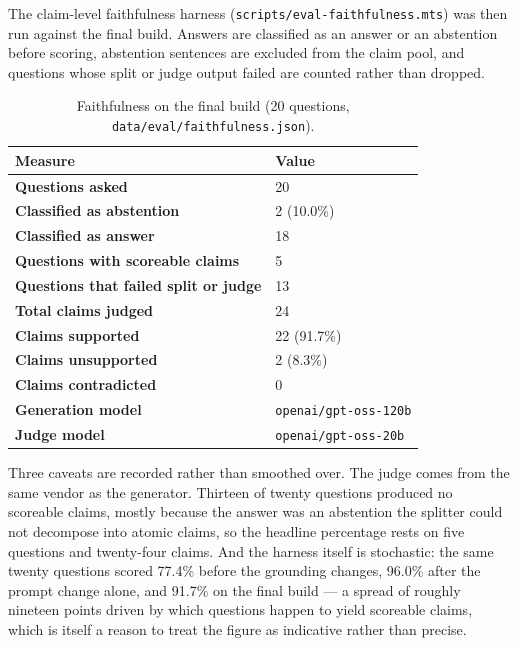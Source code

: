 \documentclass[12pt]{article}
\begin{document}
The claim-level faithfulness harness (\texttt{scripts/eval-faithfulness.mts}) was then run against the final build. Answers are classified as an answer or an abstention before scoring, abstention sentences are excluded from the claim pool, and questions whose split or judge output failed are counted rather than dropped.

\begin{table}[!htbp]
\centering
\caption{Faithfulness on the final build (20 questions, \texttt{data/eval/faithfulness.json}).}
\label{tab:faith}
\begin{tabularx}{0.92\textwidth}{>{\bfseries}p{}X}
\toprule
Measure & Value \\
\midrule
Questions asked & 20 \\
Classified as abstention & 2 (10.0\%) \\
Classified as answer & 18 \\
Questions with scoreable claims & 5 \\
Questions that failed split or judge & 13 \\
Total claims judged & 24 \\
Claims supported & 22 (91.7\%) \\
Claims unsupported & 2 (8.3\%) \\
Claims contradicted & 0 \\
Generation model & \texttt{openai/gpt-oss-120b} \\
Judge model & \texttt{openai/gpt-oss-20b} \\
\bottomrule
\end{tabularx}
\end{table}

Three caveats are recorded rather than smoothed over. The judge comes from the same vendor as the generator. Thirteen of twenty questions produced no scoreable claims, mostly because the answer was an abstention the splitter could not decompose into atomic claims, so the headline percentage rests on five questions and twenty-four claims. And the harness itself is stochastic: the same twenty questions scored 77.4\% before the grounding changes, 96.0\% after the prompt change alone, and 91.7\% on the final build --- a spread of roughly nineteen points driven by which questions happen to yield scoreable claims, which is itself a reason to treat the figure as indicative rather than precise.

\clearpage
\end{document}
